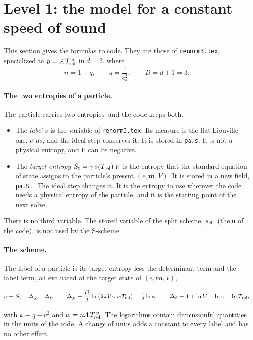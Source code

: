 \documentclass[11pt,aps,preprint,nofootinbib,superscriptaddress,tightenlines]{revtex4-2}
\def\st{\begin{equation}}
\def\stp{\end{equation}}
\let\oldparagraph\paragraph
\renewcommand{\paragraph}{\par\bigskip\oldparagraph}
\begin{document}
\section{Level 1: the model for a constant speed of sound}
\label{sec:model1}

This section gives the formulas to code.  They are those of \nolinkurl{renorm3.tex}, specialized to $p=A\,T_{\rm rel}^{\,n}$ in $d=2$, where
\st
n=1+q,\qquad q=\frac1{c_s^2},\qquad D=d+1=3 .
\stp

\paragraph{The two entropies of a particle.}  The particle carries two entropies, and the code keeps both.
\begin{itemize}
\item The \emph{label} $s$ is the variable of \nolinkurl{renorm3.tex}.  Its measure is the flat Liouville one, $e^{s}ds$, and the ideal step conserves
  it.  It is stored in \texttt{pa.s}.  It is not a physical entropy, and it can be negative.
\item The \emph{target entropy} $S_{\rm t}=\gamma\,s(T_{\rm rel})\,V$ is the entropy that the standard equation of state assigns to the particle's present
  $(e,\bm m,V)$.  It is stored in a new field, \texttt{pa.St}.  The ideal step changes it.  It is the entropy to use wherever the code needs a physical
  entropy of the particle, and it is the starting point of the next solve.
\end{itemize}
There is no third variable.  The stored variable of the split scheme, $s_{\rm eff}$ (the \texttt{u} of the code), is not used by the S-scheme.

\paragraph{The scheme.}  The label of a particle is its target entropy less the determinant term and the label term, all evaluated at the target
state of $(e,\bm m,V)$,
\begin{keyeq}
\st
s=S_{\rm t}-\Delta_\chi-\Delta_\ell,\qquad
\Delta_\chi=\frac D2\ln\big(2\pi V\gamma\,wT_{\rm rel}\big)+\tfrac12\ln a,\qquad
\Delta_\ell=1+\ln V+\ln\gamma-\ln T_{\rm rel} ,
\label{label}
\stp
\end{keyeq}
with $a\equiv q-v^2$ and $w=nA\,T_{\rm rel}^{\,n}$.  The logarithms contain dimensionful quantities in the units of the code.  A change of units adds a
constant to every label and has no other effect.
\end{document}
